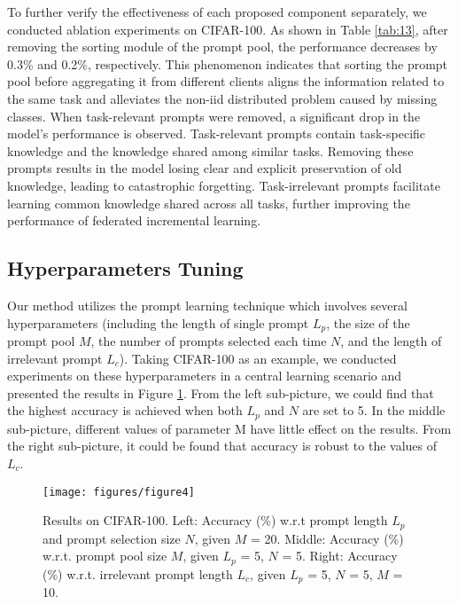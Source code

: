 \documentclass[sigconf,anonymous,review,screen]{acmart}
\begin{document}
To further verify the effectiveness of each proposed component separately, we conducted ablation experiments on CIFAR-100. As shown in Table \ref{tab:13}, after removing the sorting module of the prompt pool, the performance decreases by 0.3\% and 0.2\%, respectively. This phenomenon indicates that sorting the prompt pool before aggregating it from different clients aligns the information related to the same task and alleviates the non-iid distributed problem caused by missing classes. When task-relevant prompts were removed, a significant drop in the model's performance is observed. Task-relevant prompts contain task-specific knowledge and the knowledge shared among similar tasks. Removing these prompts results in the model losing clear and explicit preservation of old knowledge, leading to catastrophic forgetting. Task-irrelevant prompts facilitate learning common knowledge shared across all tasks, further improving the performance of federated incremental learning.






\subsection{Hyperparameters Tuning}
Our method utilizes the prompt learning technique which involves several hyperparameters (including the length of single prompt $L_p$, the size of the prompt pool $M$, the number of prompts selected each time $N$, and the length of irrelevant prompt $L_c$). Taking CIFAR-100 as an example, we conducted experiments on these hyperparameters in a central learning scenario and presented the results in Figure \ref{fig_7}. From the left sub-picture, we could find that the highest accuracy is achieved when both $L_p$ and $N$ are set to 5. In the middle sub-picture, different values of parameter M have little effect on the results. From the right sub-picture, it could be found that accuracy is robust to the values of $L_c$.




\begin{figure}
	\centering %
	\texttt{[image: figures/figure4]}
	\caption{Results on CIFAR-100. Left: Accuracy (\%) w.r.t prompt length $L_p$ and prompt selection size $N$, given $M$ = 20. Middle: Accuracy (\%) w.r.t. prompt pool size $M$, given $L_p$ = 5, $N$ = 5. Right: Accuracy (\%) w.r.t. irrelevant prompt length $L_c$, given $L_p$ = 5, $N$ = 5, $M$ = 10.}
	\label{fig_7}
\end{figure}
\end{document}
